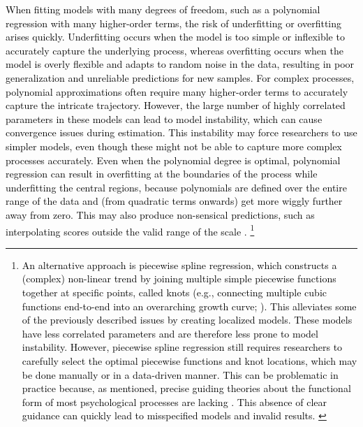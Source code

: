\documentclass[man, floatsintext]{apa7}
\begin{document}
\textcolor{black}{
  When fitting models with many degrees of freedom, such as a polynomial
  regression with many higher-order terms, the risk of underfitting or
  overfitting arises quickly. Underfitting occurs when the model is too simple
  or inflexible to accurately capture the underlying process, whereas
  overfitting occurs when the model is overly flexible and adapts to random
  noise in the data, resulting in poor generalization and unreliable
  predictions for new samples. For complex processes, polynomial approximations
  often require many higher-order terms to accurately capture the intricate
  trajectory. However, the large number of highly correlated parameters in
  these models can lead to model instability, which can cause convergence
  issues during estimation. This instability may force researchers to use
  simpler models, even though these might not be able to capture more complex
  processes accurately. Even when the polynomial degree is optimal, polynomial
  regression can result in overfitting at the boundaries of the process while
  underfitting the central regions, because polynomials are defined over the
  entire range of the data and (from quadratic terms onwards) get more wiggly
  further away from zero. This may also produce non-sensical predictions, such
  as interpolating scores outside the valid range of the scale
  \parencite{magee_nonlocal_1998, boyd_divergence_2009, harrell_general_2001,
    jianan_case_2023}.
}\footnote{\textcolor{black}{
    An alternative approach is piecewise spline regression, which
    constructs a
    (complex) non-linear trend by joining multiple simple piecewise functions
    together at specific points, called knots (e.g., connecting multiple cubic
    functions end-to-end into an overarching growth curve;
    \textcite{tsay_nonlinear_2019}). \textcolor{black}{This alleviates some of
      the
      previously described issues by creating localized models. These models
      have
      less correlated parameters and are therefore less prone to model
      instability.
      However, piecewise spline regression still requires researchers to
      carefully
      select the optimal piecewise functions and knot locations, which may be
      done
      manually or in a data-driven manner}. This can be problematic in practice
    because, as mentioned, precise guiding theories about the functional form
    of
    most psychological processes are lacking \parencite{tan_time-varying_2011}.
    This absence of clear guidance can quickly lead to misspecified models and
    invalid results.
  }
}
\end{document}
